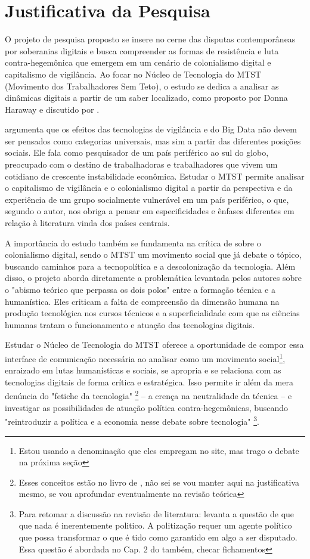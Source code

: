 \section{Justificativa da Pesquisa}
\label{sec:just}

O projeto de pesquisa proposto se insere no cerne das disputas contemporâneas por soberanias digitais e busca compreender as formas de resistência e luta contra-hegemônica que emergem em um cenário de colonialismo digital e capitalismo de vigilância. Ao focar no Núcleo de Tecnologia do MTST (Movimento dos Trabalhadores Sem Teto), o estudo se dedica a analisar as dinâmicas digitais a partir de um saber localizado, como proposto por Donna Haraway e discutido por .

 argumenta que os efeitos das tecnologias de vigilância e do Big Data não devem ser pensados como categorias universais, mas sim a partir das diferentes posições sociais. Ele fala como pesquisador de um país periférico ao sul do globo, preocupado com o destino de trabalhadoras e trabalhadores que vivem um cotidiano de crescente instabilidade econômica. Estudar o MTST permite analisar o capitalismo de vigilância e o colonialismo digital a partir da perspectiva e da experiência de um grupo socialmente vulnerável em um país periférico, o que, segundo o autor, nos obriga a pensar em especificidades e ênfases diferentes em relação à literatura vinda dos países centrais.

A importância do estudo também se fundamenta na crítica de  sobre o colonialismo digital, sendo o MTST um movimento social que já debate o tópico, buscando caminhos para a tecnopolítica e a descolonização da tecnologia. Além disso, o projeto aborda diretamente a problemática levantada pelos autores sobre o "abismo teórico que perpassa os dois polos" \cite[p.~30]{Faustino2023} entre a formação técnica e a humanística. Eles criticam a falta de compreensão da dimensão humana na produção tecnológica nos cursos técnicos e a superficialidade com que as ciências humanas tratam o funcionamento e atuação das tecnologias digitais. 

Estudar o Núcleo de Tecnologia do MTST oferece a oportunidade de compor essa interface de comunicação necessária ao analisar como um movimento social\footnote{Estou usando a denominação que eles empregam no site, mas trago o debate na próxima seção}, enraizado em lutas humanísticas e sociais, se apropria e se relaciona com as tecnologias digitais de forma crítica e estratégica. Isso permite ir além da mera denúncia do "fetiche da tecnologia" \footnote{Esses conceitos estão no livro de \cite{Faustino2023}, não sei se vou manter aqui na justificativa mesmo, se vou aprofundar eventualmente na revisão teórica} – a crença na neutralidade da técnica – e investigar as possibilidades de atuação política contra-hegemônicas, buscando "reintroduzir a política e a economia nesse debate sobre tecnologia" \footnote{Para retomar a discussão na revisão de literatura: \citeauthor{fisher_2020} levanta a questão de que  que nada é inerentemente politico. A politização requer um agente político que possa transformar o que é tido como garantido em algo a ser disputado. Essa questão é abordada no Cap. 2 do \cite{Silveira2021} também, checar fichamentos}.
